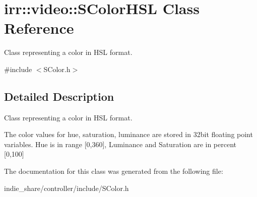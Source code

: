 \hypertarget{classirr_1_1video_1_1SColorHSL}{}\section{irr\+:\+:video\+:\+:S\+Color\+H\+SL Class Reference}
\label{classirr_1_1video_1_1SColorHSL}


Class representing a color in H\+SL format.  




{\ttfamily \#include $<$S\+Color.\+h$>$}



\subsection{Detailed Description}
Class representing a color in H\+SL format. 

The color values for hue, saturation, luminance are stored in 32bit floating point variables. Hue is in range \mbox{[}0,360\mbox{]}, Luminance and Saturation are in percent \mbox{[}0,100\mbox{]} 

The documentation for this class was generated from the following file\+:\begin{DoxyCompactItemize}
\item 
indie\+\_\+share/controller/include/S\+Color.\+h\end{DoxyCompactItemize}

